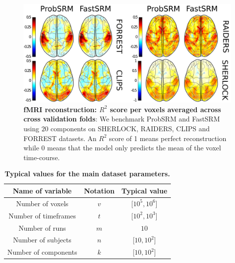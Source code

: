 \begin{figure}
\centering
\includegraphics[scale=0.43]{figures/srm/mean_r2_reconstruction.png}
\caption{\textbf{fMRI reconstruction: $R^2$ score per voxels averaged across cross validation folds}: We benchmark ProbSRM and FastSRM using $20$ components on SHERLOCK, RAIDERS, CLIPS and FORREST datasets. An $R^2$ score of 1 means perfect reconstruction while 0 means that the model only predicts the mean of the voxel time-course.}
\label{fig:example_r2}
\end{figure}


\begin{table}
\centering
\begin{tabular}{c|c|c}
	Name of variable &  Notation & Typical value \\
	\hline
	Number of voxels & $v$ & [$10^5, 10^6$] \\
	Number of timeframes & $t$ & [$10^2, 10^3$] \\
	Number of runs & $m$ & $10$ \\
	Number of subjects & $n$ & [$10, 10^2$] \\
	Number of components & $k$ & [$10, 10^2$]
\end{tabular}
\caption{\textbf{Typical values for the main dataset parameters.}}
\label{tab:typical}
\end{table}

